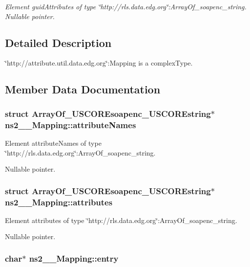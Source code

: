\begin{CompactItemize}
\begin{CompactList}\small\item\em Element guid\-Attributes of type \char`\"{}http://rls.data.edg.org\char`\"{}:Array\-Of\_\-soapenc\_\-string. Nullable pointer. \item\end{CompactList}\end{CompactItemize}


\subsection{Detailed Description}
\char`\"{}http://attribute.util.data.edg.org\char`\"{}:Mapping is a complex\-Type. 



\subsection{Member Data Documentation}
\subsubsection{\setlength{\rightskip}{0pt plus 5cm}struct \bf{Array\-Of\_\-USCOREsoapenc\_\-USCOREstring}$\ast$ \bf{ns2\_\-\_\-Mapping::attribute\-Names}}\label{structns2____Mapping_4b80c1068ebe2c530a7efd1d613c869a}


Element attribute\-Names of type \char`\"{}http://rls.data.edg.org\char`\"{}:Array\-Of\_\-soapenc\_\-string. 

Nullable pointer. 
\subsubsection{\setlength{\rightskip}{0pt plus 5cm}struct \bf{Array\-Of\_\-USCOREsoapenc\_\-USCOREstring}$\ast$ \bf{ns2\_\-\_\-Mapping::attributes}}\label{structns2____Mapping_239e76c8fa630493230f81cb26c42368}


Element attributes of type \char`\"{}http://rls.data.edg.org\char`\"{}:Array\-Of\_\-soapenc\_\-string. 

Nullable pointer. 
\subsubsection{\setlength{\rightskip}{0pt plus 5cm}char$\ast$ \bf{ns2\_\-\_\-Mapping::entry}}\label{structns2____Mapping_37164b7a9f5b4828b78b3edc2d1db656}


